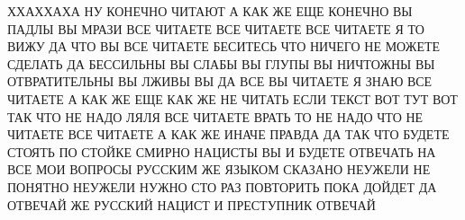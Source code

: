  
 
 
 
 

ХХАХХАХА НУ КОНЕЧНО ЧИТАЮТ А КАК ЖЕ ЕЩЕ КОНЕЧНО ВЫ ПАДЛЫ ВЫ МРАЗИ ВСЕ ЧИТАЕТЕ
ВСЕ ЧИТАЕТЕ ВСЕ ЧИТАЕТЕ Я ТО ВИЖУ ДА ЧТО ВЫ ВСЕ ЧИТАЕТЕ БЕСИТЕСЬ ЧТО НИЧЕГО НЕ
МОЖЕТЕ СДЕЛАТЬ ДА БЕССИЛЬНЫ ВЫ СЛАБЫ ВЫ ГЛУПЫ ВЫ НИЧТОЖНЫ ВЫ ОТВРАТИТЕЛЬНЫ ВЫ
ЛЖИВЫ ВЫ ДА ВСЕ ВЫ ЧИТАЕТЕ Я ЗНАЮ ВСЕ ЧИТАЕТЕ А КАК ЖЕ ЕЩЕ КАК ЖЕ НЕ ЧИТАТЬ
ЕСЛИ ТЕКСТ ВОТ ТУТ ВОТ ТАК ЧТО НЕ НАДО ЛЯЛЯ ВСЕ ЧИТАЕТЕ ВРАТЬ ТО НЕ НАДО ЧТО НЕ
ЧИТАЕТЕ ВСЕ ЧИТАЕТЕ А КАК ЖЕ ИНАЧЕ ПРАВДА ДА ТАК ЧТО БУДЕТЕ СТОЯТЬ ПО СТОЙКЕ
СМИРНО НАЦИСТЫ ВЫ И БУДЕТЕ ОТВЕЧАТЬ НА ВСЕ МОИ ВОПРОСЫ РУССКИМ ЖЕ ЯЗЫКОМ
СКАЗАНО НЕУЖЕЛИ НЕ ПОНЯТНО НЕУЖЕЛИ НУЖНО СТО РАЗ ПОВТОРИТЬ ПОКА ДОЙДЕТ ДА
ОТВЕЧАЙ ЖЕ РУССКИЙ НАЦИСТ И ПРЕСТУПНИК ОТВЕЧАЙ
